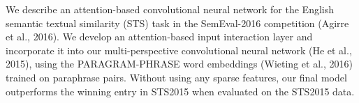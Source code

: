 We describe an attention-based convolutional neural network for the English semantic textual similarity (STS) task in the SemEval-2016 competition (Agirre et al., 2016). We develop an attention-based input interaction layer and incorporate it into our multi-perspective convolutional neural network (He et al., 2015), using the PARAGRAM-PHRASE word embeddings (Wieting et al., 2016) trained on paraphrase pairs. Without using any sparse features, our final model outperforms the winning entry in STS2015 when evaluated on the STS2015 data.
